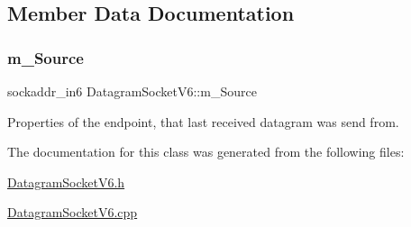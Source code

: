 \subsection{Member Data Documentation}
\mbox{\label{classDatagramSocketV6_a5a82b5500e449bcd0017284e8b18a9a5}} 
\subsubsection{\texorpdfstring{m\+\_\+\+Source}{m\_Source}}
{\footnotesize\ttfamily sockaddr\+\_\+in6 Datagram\+Socket\+V6\+::m\+\_\+\+Source\hspace{0.3cm}{\ttfamily [protected]}}



Properties of the endpoint, that last received datagram was send from. 



The documentation for this class was generated from the following files\+:\begin{DoxyCompactItemize}
\item 
\hyperlink{DatagramSocketV6_8h}{Datagram\+Socket\+V6.\+h}\item 
\hyperlink{DatagramSocketV6_8cpp}{Datagram\+Socket\+V6.\+cpp}\end{DoxyCompactItemize}
